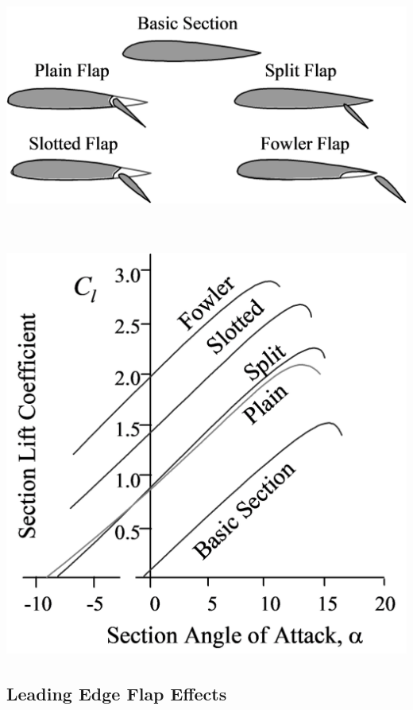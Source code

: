 \documentclass[
]{book}
\begin{document}
\includegraphics[width=7in,height=3.438in]{media/05/image18.svg}

\includegraphics[width=5.3in,height=5.3in]{media/05/image19.svg}

\hypertarget{leading-edge-flap-effects}{%
\subsection*{Leading Edge Flap Effects}\label{leading-edge-flap-effects}}
\end{document}

